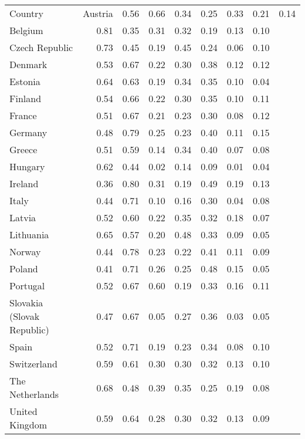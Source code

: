 \begin{tabular}{lrrrrrrr}
  \toprule
Country & %
  \midrule
Austria & 0.56 & 0.66 & 0.34 & 0.25 & 0.33 & 0.21 & 0.14 \\ 
  Belgium & 0.81 & 0.35 & 0.31 & 0.32 & 0.19 & 0.13 & 0.10 \\ 
  Czech Republic & 0.73 & 0.45 & 0.19 & 0.45 & 0.24 & 0.06 & 0.10 \\ 
  Denmark & 0.53 & 0.67 & 0.22 & 0.30 & 0.38 & 0.12 & 0.12 \\ 
  Estonia & 0.64 & 0.63 & 0.19 & 0.34 & 0.35 & 0.10 & 0.04 \\ 
  Finland & 0.54 & 0.66 & 0.22 & 0.30 & 0.35 & 0.10 & 0.11 \\ 
  France & 0.51 & 0.67 & 0.21 & 0.23 & 0.30 & 0.08 & 0.12 \\ 
  Germany & 0.48 & 0.79 & 0.25 & 0.23 & 0.40 & 0.11 & 0.15 \\ 
  Greece & 0.51 & 0.59 & 0.14 & 0.34 & 0.40 & 0.07 & 0.08 \\ 
  Hungary & 0.62 & 0.44 & 0.02 & 0.14 & 0.09 & 0.01 & 0.04 \\ 
  Ireland & 0.36 & 0.80 & 0.31 & 0.19 & 0.49 & 0.19 & 0.13 \\ 
  Italy & 0.44 & 0.71 & 0.10 & 0.16 & 0.30 & 0.04 & 0.08 \\ 
  Latvia & 0.52 & 0.60 & 0.22 & 0.35 & 0.32 & 0.18 & 0.07 \\ 
  Lithuania & 0.65 & 0.57 & 0.20 & 0.48 & 0.33 & 0.09 & 0.05 \\ 
  Norway & 0.44 & 0.78 & 0.23 & 0.22 & 0.41 & 0.11 & 0.09 \\ 
  Poland & 0.41 & 0.71 & 0.26 & 0.25 & 0.48 & 0.15 & 0.05 \\ 
  Portugal & 0.52 & 0.67 & 0.60 & 0.19 & 0.33 & 0.16 & 0.11 \\ 
  Slovakia (Slovak Republic) & 0.47 & 0.67 & 0.05 & 0.27 & 0.36 & 0.03 & 0.05 \\ 
  Spain & 0.52 & 0.71 & 0.19 & 0.23 & 0.34 & 0.08 & 0.10 \\ 
  Switzerland & 0.59 & 0.61 & 0.30 & 0.30 & 0.32 & 0.13 & 0.10 \\ 
  The Netherlands & 0.68 & 0.48 & 0.39 & 0.35 & 0.25 & 0.19 & 0.08 \\ 
  United Kingdom & 0.59 & 0.64 & 0.28 & 0.30 & 0.32 & 0.13 & 0.09 \\ 
   \bottomrule
\end{tabular}
